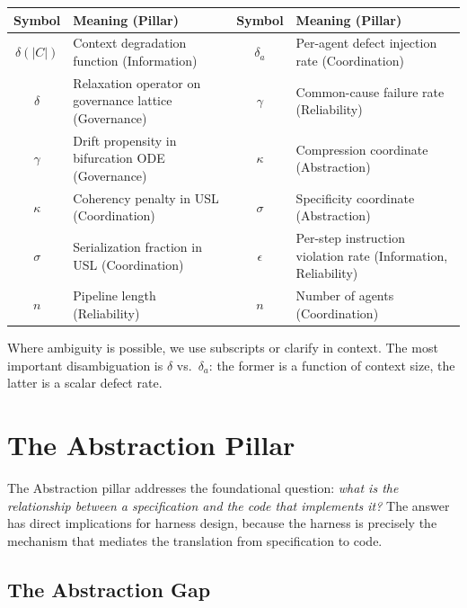 \documentclass[11pt, a4paper, logo, copyright]{googledeepmind}
\begin{document}
\begin{center}
\small
\begin{tabular}{clcl}
\toprule
Symbol & Meaning (Pillar) & Symbol & Meaning (Pillar) \\
\midrule
$\delta(|C|)$ & Context degradation function (Information) & $\delta_a$ & Per-agent defect injection rate (Coordination) \\
$\delta$ & Relaxation operator on governance lattice (Governance) & $\gamma$ & Common-cause failure rate (Reliability) \\
$\gamma$ & Drift propensity in bifurcation ODE (Governance) & $\kappa$ & Compression coordinate (Abstraction) \\
$\kappa$ & Coherency penalty in USL (Coordination) & $\sigma$ & Specificity coordinate (Abstraction) \\
$\sigma$ & Serialization fraction in USL (Coordination) & $\epsilon$ & Per-step instruction violation rate (Information, Reliability) \\
$n$ & Pipeline length (Reliability) & $n$ & Number of agents (Coordination) \\
\bottomrule
\end{tabular}
\end{center}
Where ambiguity is possible, we use subscripts or clarify in context. The most important disambiguation is $\delta$ vs.\ $\delta_a$: the former is a function of context size, the latter is a scalar defect rate.


\section{The Abstraction Pillar}
\label{sec:abstraction}

The Abstraction pillar addresses the foundational question: \emph{what is the relationship between a specification and the code that implements it?} The answer has direct implications for harness design, because the harness is precisely the mechanism that mediates the translation from specification to code.

\subsection{The Abstraction Gap}
\end{document}
